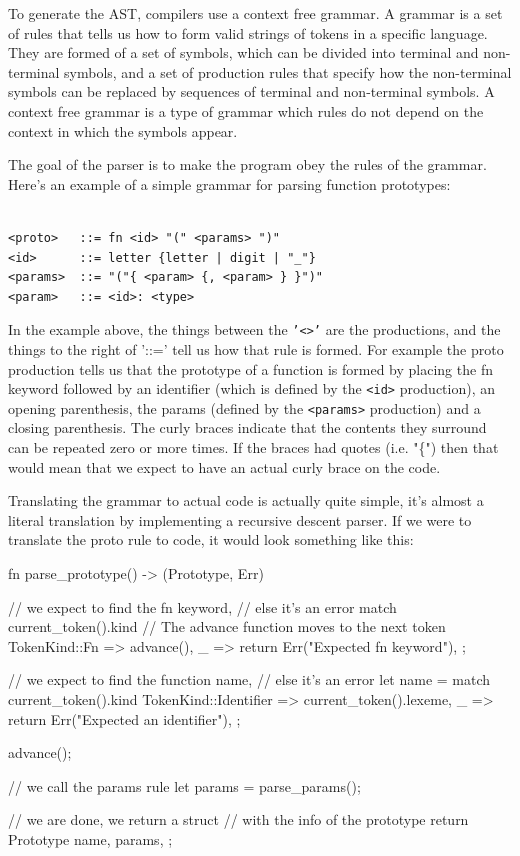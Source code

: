 ﻿\documentclass[10pt,a4paper,twocolumn,twoside]{article}
\begin{document}
To generate the AST, compilers use a context free grammar. A grammar is a set of
rules that tells us how to form valid strings of tokens in a specific language.
They are formed of a set of symbols, which can be divided into terminal and
non-terminal symbols, and a set of production rules that specify how the
non-terminal symbols can be replaced by sequences of terminal and non-terminal
symbols. A context free grammar is a type of grammar which rules do not depend
on the context in which the symbols appear.

The goal of the parser is to make the program obey the rules of the grammar.
Here's an example of a simple grammar for parsing function prototypes:

\begin{small}
\begin{verbatim}

<proto>   ::= fn <id> "(" <params> ")"
<id>      ::= letter {letter | digit | "_"}
<params>  ::= "("{ <param> {, <param> } }")"
<param>   ::= <id>: <type>

\end{verbatim}
\end{small}

In the example above, the things between the \texttt{'<>'} are the productions,
and the things to the right of '::=' tell us how that rule is formed. For
example the proto production tells us that the prototype of a function is formed
by placing the fn keyword followed by an identifier (which is defined by the
\texttt{<id>} production), an opening parenthesis, the params (defined by the
\texttt{<params>} production) and a closing parenthesis. The curly braces 
indicate that the contents they surround can be repeated zero or more times. 
If the braces had quotes (i.e. "\{") then that would mean that we expect to have 
an actual curly brace on the code.

\vspace{10px}

Translating the grammar to actual code is actually quite simple, it's almost a
literal translation by implementing a recursive descent parser. If we were to
translate the proto rule to code, it would look something like this:
\vfill

\begin{code}
fn parse_prototype() -> (Prototype, Err) {
    // we expect to find the fn keyword,
    // else it's an error
    match current_token().kind {
        // The advance function moves to the next token
        TokenKind::Fn => advance(),
        _ => return Err("Expected fn keyword"),
    };

    // we expect to find the function name,
    // else it's an error
    let name = match current_token().kind {
        TokenKind::Identifier => current_token().lexeme,
        _ => return Err("Expected an identifier"),
    };

    advance();

    // we call the params rule
    let params = parse_params();

    // we are done, we return a struct 
    // with the info of the prototype
    return Prototype { 
        name,
        params,
    };
}
\end{code}
\end{document}
